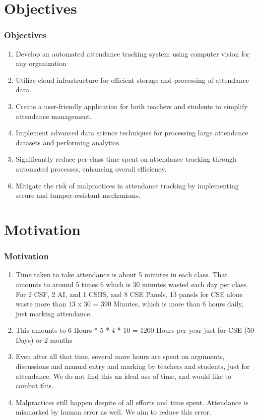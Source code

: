 \documentclass[aspectratio=169]{beamer}
\begin{document}
\section{Objectives}
\begin{frame}
	\frametitle{Objectives}
	\centering
	\begin{minipage}{0.95\textwidth}
		\begin{enumerate}
			\item Develop an automated attendance tracking system using computer vision for any organization
			\item Utilize cloud infrastructure for efficient storage and processing of attendance data.
			\item Create a user-friendly application for both teachers and students to simplify attendance management.
			\item Implement advanced data science techniques for processing large attendance datasets and performing analytics.
			\item Significantly reduce per-class time spent on attendance tracking through automated processes, enhancing overall efficiency.
			\item Mitigate the risk of malpractices in attendance tracking by implementing secure and tamper-resistant mechanisms.
		\end{enumerate}
	\end{minipage}
\end{frame}


\section{Motivation}
\begin{frame}
	\frametitle{Motivation}
	\begin{minipage}{0.95\textwidth}
		\begin{enumerate}
			\item Time taken to take attendance is about 5 minutes in each class. That amounts to around 5 times 6 which is 30 minutes wasted each day per class. For 2 CSF, 2 AI, and 1 CSBS, and 8 CSE Panels, 13 panels for CSE alone waste more than 13 x 30 = 390 Minutes, which is more than 6 hours daily, just marking attendance.
			\item This amounts to 6 Hours * 5 * 4 * 10 = 1200 Hours per year just for CSE (50 Days) or 2 months
			\item Even after all that time, several more hours are spent on arguments, discussions and manual entry and marking by teachers and students, just for attendance. We do not find this an ideal use of time, and would like to combat this.
			\item Malpractices still happen despite of all efforts and time spent. Attendance is mismarked by human error as well. We aim to reduce this error.
		\end{enumerate}
	\end{minipage}

\end{frame}
\end{document}
